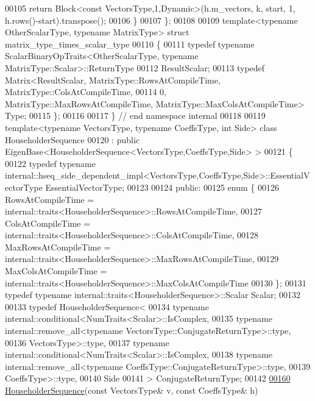 \begin{DoxyCode}
00105     \textcolor{keywordflow}{return} Block<const VectorsType,1,Dynamic>(h.m\_vectors, k, start, 1, h.rows()-start).transpose();
00106   \}
00107 \};
00108 
00109 \textcolor{keyword}{template}<\textcolor{keyword}{typename} OtherScalarType, \textcolor{keyword}{typename} MatrixType> \textcolor{keyword}{struct }matrix\_type\_times\_scalar\_type
00110 \{
00111   \textcolor{keyword}{typedef} \textcolor{keyword}{typename} ScalarBinaryOpTraits<OtherScalarType, typename MatrixType::Scalar>::ReturnType
00112     ResultScalar;
00113   \textcolor{keyword}{typedef} Matrix<ResultScalar, MatrixType::RowsAtCompileTime, MatrixType::ColsAtCompileTime,
00114                  0, MatrixType::MaxRowsAtCompileTime, MatrixType::MaxColsAtCompileTime> Type;
00115 \};
00116 
00117 \} \textcolor{comment}{// end namespace internal}
00118 
00119 \textcolor{keyword}{template}<\textcolor{keyword}{typename} VectorsType, \textcolor{keyword}{typename} CoeffsType, \textcolor{keywordtype}{int} S\textcolor{keywordtype}{id}e> \textcolor{keyword}{class }HouseholderSequence
00120   : \textcolor{keyword}{public} EigenBase<HouseholderSequence<VectorsType,CoeffsType,Side> >
00121 \{
00122     \textcolor{keyword}{typedef} \textcolor{keyword}{typename} internal::hseq\_side\_dependent\_impl<VectorsType,CoeffsType,Side>::EssentialVectorType 
      EssentialVectorType;
00123   
00124   \textcolor{keyword}{public}:
00125     \textcolor{keyword}{enum} \{
00126       RowsAtCompileTime = internal::traits<HouseholderSequence>::RowsAtCompileTime,
00127       ColsAtCompileTime = internal::traits<HouseholderSequence>::ColsAtCompileTime,
00128       MaxRowsAtCompileTime = internal::traits<HouseholderSequence>::MaxRowsAtCompileTime,
00129       MaxColsAtCompileTime = internal::traits<HouseholderSequence>::MaxColsAtCompileTime
00130     \};
00131     \textcolor{keyword}{typedef} \textcolor{keyword}{typename} internal::traits<HouseholderSequence>::Scalar Scalar;
00132 
00133     \textcolor{keyword}{typedef} HouseholderSequence<
00134       \textcolor{keyword}{typename} internal::conditional<NumTraits<Scalar>::IsComplex,
00135         \textcolor{keyword}{typename} internal::remove\_all<typename VectorsType::ConjugateReturnType>::type,
00136         VectorsType>::type,
00137       \textcolor{keyword}{typename} internal::conditional<NumTraits<Scalar>::IsComplex,
00138         \textcolor{keyword}{typename} internal::remove\_all<typename CoeffsType::ConjugateReturnType>::type,
00139         CoeffsType>::type,
00140       Side
00141     > ConjugateReturnType;
00142 
\hyperlink{group___householder___module_af6aeede87ed8dac452f4fa8b4f45c3f2}{00160}     \hyperlink{group___householder___module_af6aeede87ed8dac452f4fa8b4f45c3f2}{HouseholderSequence}(\textcolor{keyword}{const} VectorsType& v, \textcolor{keyword}{const} CoeffsType& h)

\end{DoxyCode}
